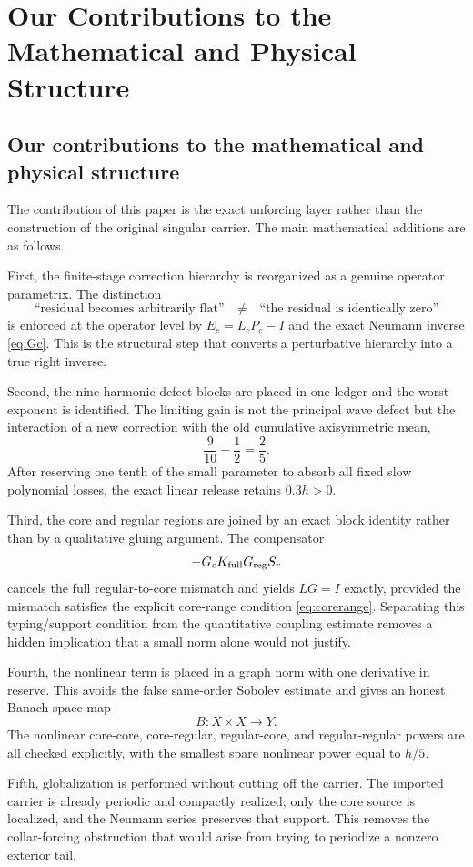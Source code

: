 \documentclass[11pt]{article}
\numberwithin{equation}{section}
\begin{document}
\section{Our Contributions to the Mathematical and Physical Structure}\label{sec:contrib}

\subsection{Our contributions to the mathematical and physical structure}
The contribution of this paper is the exact unforcing layer rather than the construction of the original singular carrier.  The main mathematical additions are as follows.

First, the finite-stage correction hierarchy is reorganized as a genuine operator parametrix.  The distinction
\[
\text{``residual becomes arbitrarily flat''}
\quad\neq\quad
\text{``the residual is identically zero''}
\]
is enforced at the operator level by \(E_c=L_cP_c-I\) and the exact Neumann inverse \eqref{eq:Gc}.  This is the structural step that converts a perturbative hierarchy into a true right inverse.

Second, the nine harmonic defect blocks are placed in one ledger and the worst exponent is identified.  The limiting gain is not the principal wave defect but the interaction of a new correction with the old cumulative axisymmetric mean,
\[
\frac9{10}-\frac12=\frac25.
\]
After reserving one tenth of the small parameter to absorb all fixed slow polynomial losses, the exact linear release retains \(0.3h>0\).

Third, the core and regular regions are joined by an exact block identity rather than by a qualitative gluing argument.  The compensator
\[
-G_cK_{\rm full}G_{\rm reg}S_r
\]
cancels the full regular-to-core mismatch and yields \(LG=I\) exactly, provided the mismatch satisfies the explicit core-range condition \eqref{eq:corerange}.  Separating this typing/support condition from the quantitative coupling estimate removes a hidden implication that a small norm alone would not justify.

Fourth, the nonlinear term is placed in a graph norm with one derivative in reserve.  This avoids the false same-order Sobolev estimate and gives an honest Banach-space map
\[
B:X\times X\to Y.
\]
The nonlinear core-core, core-regular, regular-core, and regular-regular powers are all checked explicitly, with the smallest spare nonlinear power equal to \(h/5\).

Fifth, globalization is performed without cutting off the carrier.  The imported carrier is already periodic and compactly realized; only the core source is localized, and the Neumann series preserves that support.  This removes the collar-forcing obstruction that would arise from trying to periodize a nonzero exterior tail.
\end{document}
